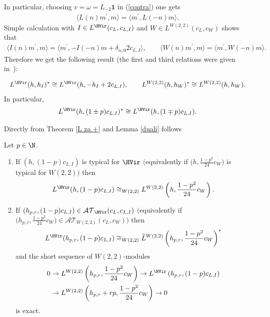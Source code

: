 In particular, choosing $v=\omega =L_{-2}\boldsymbol{1}$ in (\ref{contra}) one gets
\begin{gather*}
\langle L(n) m^{\prime },m\rangle =\langle m^{\prime },L(-n) m\rangle .
\end{gather*}
Simple calculation with $I\in L^{\HVir}(c_{L},c_{L,I}) $ and $W\in L^{W(2,2) } ( c_{L},c_{W} ) $ shows that
\begin{gather*}
\langle I(n) m^{\prime },m\rangle = \langle m^{\prime },-I(-n) m+\delta _{n,0}2c_{L,I} \rangle , \qquad
\langle W(n) m^{\prime },m\rangle =\langle m^{\prime },W(-n) m\rangle .
\end{gather*}
Therefore we get the following result (the f\/irst and third relations were given in~\cite{nas}):

\begin{Lemma}\label{duali}
\begin{gather*}
L^{\HVir}(h,h_{I})^{\ast} \cong L^{\HVir}(h,-h_{I}+2c_{L,I}),\qquad
L^{W(2,2) }(h,h_{W})^{\ast} \cong L^{W(2,2) }(h,h_{W}) .
\end{gather*}
In particular,
\begin{gather*}
L^{\HVir}(h,(1\pm p) c_{L,I})^{\ast}\cong L^{\HVir}(h,(1\mp p) c_{L,I}).
\end{gather*}
\end{Lemma}

Directly from Theorem \ref{L za +} and Lemma \ref{duali} follows

\begin{Corollary}\label{L za -}Let $p \in \N $.
\begin{enumerate}\itemsep=0pt
\item[$(i)$] If $(h,(1-p) c_{L,I})$ is typical for $\HVir$ $($equivalently if $\big( h,\frac{1-p^{2}}{24}c_{W}\big) $ is typical for $W(2,2))$ then
\begin{gather*}
L^{\HVir} ( h,(1-p) c_{L,I} ) \cong_{W(2,2) }L^{W(2,2)}\left( h,\frac{1-p^{2}}{24}c_{W}\right) .
\end{gather*}

\item[$(ii)$] If $(h_{p,r},(1-p) c_{L,I}) \in {\mathcal {AT} }_{\HVir} ( c_L, c_{L,I} )$ $($equivalently if $ \big(h_{p,r},\frac{1-p^{2}}{24}c_{W}\big) \in {\mathcal {AT} }_{W(2,2)} ( c_L, c_W ) )$ then
\begin{gather*}
L^{\HVir} ( h_{p,r},(1-p) c_{L,I} ) \cong_{W(2,2) }\widetilde{L}^{W(2,2)}\left( h_{p,r},\frac{1-p^{2}}{24}c_{W}\right) ^{\ast}
\end{gather*}
and the short sequence of $W(2,2)$-modules
\begin{align*}
0 & \rightarrow L^{W(2,2)}\left( h_{p,r},\frac{1-p^{2}}{24}c_{W}\right)
\rightarrow L^{\HVir}\left( h_{p,r},(1-p) c_{L,I}\right) \\ %
& \rightarrow L^{W(2,2)}\left( h_{p,r}+rp,\frac{1-p^{2}}{24}c_{W}\right)
\rightarrow0 \nonumber
\end{align*}
is exact.
\end{enumerate}
\end{Corollary}
